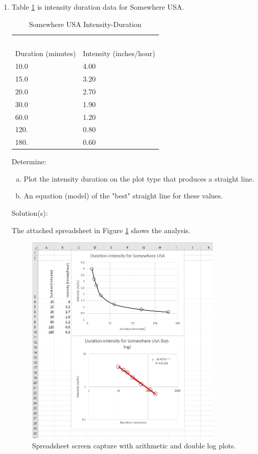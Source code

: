 \documentclass[12pt]{article}
\begin{document}
\begin{enumerate}
\clearpage


\item Table \ref{tab:SomewhereUSARainIDF} is intensity duration data for Somewhere USA.

\begin{table}[h!]
\centering
\caption{Somewhere USA Intensity-Duration}
\begin{tabular}{p{2.0in}p{2.0in}} %
~&~\\
Duration (minutes) & Intensity (inches/hour) \\
\hline
\hline
10.0 & 4.00 \\
15.0 & 3.20 \\
20.0 & 2.70 \\
30.0 & 1.90 \\
60.0 & 1.20 \\
120. & 0.80 \\
180. & 0.60 \\
\hline
\end{tabular}
\label{tab:SomewhereUSARainIDF}
\end{table}

Determine:
    \begin{enumerate}[a)]
        \item Plot the intensity duration on the plot type that produces a straight line.
        \item An equation (model) of the "best" straight line for these values. 
    \end{enumerate}

Solution(s):

The attached spreadsheet in Figure \ref{fig:es2-7xls} shows the analysis.  

\begin{figure}[h!] %
   \centering
   \includegraphics[height=4in]{es2-7xls.png} 
   \caption{Spreadsheet screen capture with arithmetic and double log plots.}
   \label{fig:es2-7xls}
\end{figure}


\end{enumerate}
\end{document}
